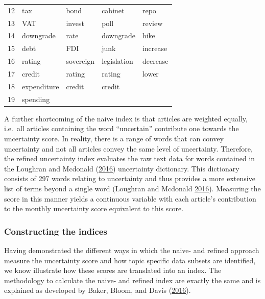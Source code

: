 \documentclass[11pt,preprint, authoryear]{elsarticle}
\let\origtable\table
\let\endorigtable\endtable
\renewenvironment{table}[1][2] {
    \expandafter\origtable\expandafter[H]
} {
    \endorigtable
}
\numberwithin{equation}{section}
\numberwithin{figure}{section}
\numberwithin{table}{section}
\begin{document}
\begin{table}[H]
\begin{tabular}{rlrrr}
		12    & tax   & \multicolumn{1}{l}{bond} & \multicolumn{1}{l}{cabinet} & \multicolumn{1}{l}{repo} \\
		13    & VAT   & \multicolumn{1}{l}{invest} & \multicolumn{1}{l}{poll} & \multicolumn{1}{l}{review} \\
		14    & downgrade & \multicolumn{1}{l}{rate} & \multicolumn{1}{l}{downgrade} & \multicolumn{1}{l}{hike} \\
		15    & debt  & \multicolumn{1}{l}{FDI} & \multicolumn{1}{l}{junk} & \multicolumn{1}{l}{increase} \\
		16    & rating & \multicolumn{1}{l}{sovereign} & \multicolumn{1}{l}{legislation} & \multicolumn{1}{l}{decrease} \\
		17    & credit & \multicolumn{1}{l}{rating} & \multicolumn{1}{l}{rating} & \multicolumn{1}{l}{lower} \\
		18    & expenditure & \multicolumn{1}{l}{credit} & \multicolumn{1}{l}{credit} &  \\
		19    & spending &       &       &  \\
		\bottomrule
	\end{tabular}
\end{table}

A further shortcoming of the naive index is that articles are weighted
equally, i.e.~all articles containing the word ``uncertain'' contribute
one towards the uncertainty score. In reality, there is a range of words
that can convey uncertainty and not all articles convey the same level
of uncertainty. Therefore, the refined uncertainty index evaluates the
raw text data for words contained in the Loughran and Mcdonald
(\protect\hyperlink{ref-Loughran2016}{2016}) uncertainty dictionary.
This dictionary consists of 297 words relating to uncertainty and thus
provides a more extensive list of terms beyond a single word (Loughran and Mcdonald
\protect\hyperlink{ref-Loughran2016}{2016}). Measuring the score in this
manner yields a continuous variable with each article's contribution to
the monthly uncertainty score equivalent to this score.


\subsubsection{\texorpdfstring{Constructing the indices
\label{ss_indices}}{Constructing the indices }}\label{constructing-the-indices}

Having demonstrated the different ways in which the naive- and refined
approach measure the uncertainty score and how topic specific data
subsets are identified, we know illustrate how these scores are translated
into an index. The methodology to calculate the naive- and
refined index are exactly the same and is explained as developed by Baker, Bloom, and Davis
(\protect\hyperlink{ref-Baker2016}{2016}).
\end{document}
